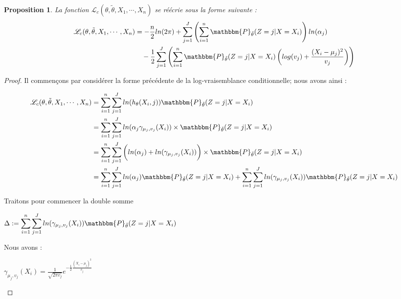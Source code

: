 \documentclass[frenchb]{report}
\newcommand{\1}{\mathbbm{1}}
\newcommand{\prob}{\mathbbm{P}}
\newcommand{\lv}{\mathcal{L}}
\newcommand{\thetat}{\tilde{\theta}}
\newtheorem{prop}{Proposition}
\theoremstyle{definition}\newtheorem{defn}{Définition}
\theoremstyle{definition}\newtheorem{exm}{Exemple}
\theoremstyle{definition}\newtheorem{nota}{Notation}
\theoremstyle{definition}\newtheorem{rem}{Remarque}
\begin{document}
\begin{prop} La fonction $\lv_{c}(\theta, \thetat, X_1, \cdots, X_n)$ se réécrie sous la forme suivante : 
\begin{align*}
 \lv_{c}(\theta, \thetat, X_1, \cdots, X_n) &= -\frac{n}{2}ln(2\pi)+\sum_{j=1}^J \left(\sum_{i = 1}^n \prob_{\thetat}(Z= j|X=X_i)\right) ln(\alpha_j)\\
&~~~-\frac{1}{2}\sum_{j=1}^J\left(\sum_{i=1}^n  \prob_{\thetat}(Z=j|X=X_i)\left(log(v_j)+\frac{(X_i-\mu_j)^2}{v_j}\right)\right)
\end{align*}
\end{prop}
\newpage
\begin{proof}

Il commençons par considérer la forme précédente de la log-vraisemblance conditionnelle; nous avons ainsi : 

\begin{align*}
 \lv_{c}(\theta, \thetat, X_1, \cdots, X_n) &= \sum_{i=1}^n \sum_{j = 1}^J ln(h_\theta(X_i,j)) \prob_{\thetat} (Z = j|X = X_i)\\
&= \sum_{i=1}^n \sum_{j = 1}^J ln(\alpha_j\gamma_{\mu_j,v_j}(X_i))\times \prob_{\thetat} (Z = j|X = X_i)\\
&= \sum_{i=1}^n \sum_{j = 1}^J \bigg(ln(\alpha_j)+ln(\gamma_{\mu_j,v_j}(X_i))\bigg)\times \prob_{\thetat} (Z = j|X = X_i)\\
&= \sum_{i=1}^n \sum_{j = 1}^J ln(\alpha_j)\prob_{\thetat} (Z = j|X = X_i)+\sum_{i=1}^n \sum_{j = 1}^J ln(\gamma_{\mu_j,v_j}(X_i))\prob_{\thetat} (Z = j|X = X_i)\\
\end{align*}

Traitons pour commencer la double somme 
\begin{center} $\Delta := \displaystyle \sum_{i=1}^n \sum_{j = 1}^J ln(\gamma_{\mu_j,v_j}(X_i))\prob_{\thetat} (Z = j|X = X_i)$ \end{center}

Nous avons :
\begin{center}
$\gamma_{\mu_j,v_j}(X_i) = \frac{1}{\sqrt{2 \pi v_j
}}e^{-\frac{1}{2}\frac{(X_i - \mu_j)^2}{v_j}}$
\end{center}


\end{proof}
\end{document}
